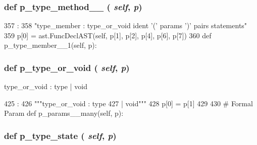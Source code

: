 \begin{DoxyVerb}
{\subsubsection[{p\_\-type\_\-method\_\-\_\-1}]{\setlength{\rightskip}{0pt plus 5cm}def p\_\-type\_\-method\_\-\_ ( {\em self}, \/   {\em p})}}
\label{classslicc_1_1parser_1_1SLICC_ad508836482d67540f8b3b5bba6461560}



\begin{DoxyCode}
357                                  :
358         "type_member : type_or_void ident '(' params ')' pairs statements"
359         p[0] = ast.FuncDeclAST(self, p[1], p[2], p[4], p[6], p[7])
360 
    def p_type_member__1(self, p):
\end{DoxyCode}
\hypertarget{classslicc_1_1parser_1_1SLICC_a48505420f44b16340027c70819004e74}{
\subsubsection[{p\_\-type\_\-or\_\-void}]{\setlength{\rightskip}{0pt plus 5cm}def p\_\-type\_\-or\_\-void ( {\em self}, \/   {\em p})}}
\label{classslicc_1_1parser_1_1SLICC_a48505420f44b16340027c70819004e74}
\begin{DoxyVerb}type_or_void : type
        | void\end{DoxyVerb}
 


\begin{DoxyCode}
425                                :
426         """type_or_void : type
427                         | void"""
428         p[0] = p[1]
429 
430     # Formal Param
    def p_params__many(self, p):
\end{DoxyCode}
\hypertarget{classslicc_1_1parser_1_1SLICC_a5d6073c10a02c57e4de563fed6c725ab}{
\subsubsection[{p\_\-type\_\-state}]{\setlength{\rightskip}{0pt plus 5cm}def p\_\-type\_\-state ( {\em self}, \/   {\em p})}}
\label{classslicc_1_1parser_1_1SLICC_a5d6073c10a02c57e4de563fed6c725ab}




\end{DoxyVerb}
